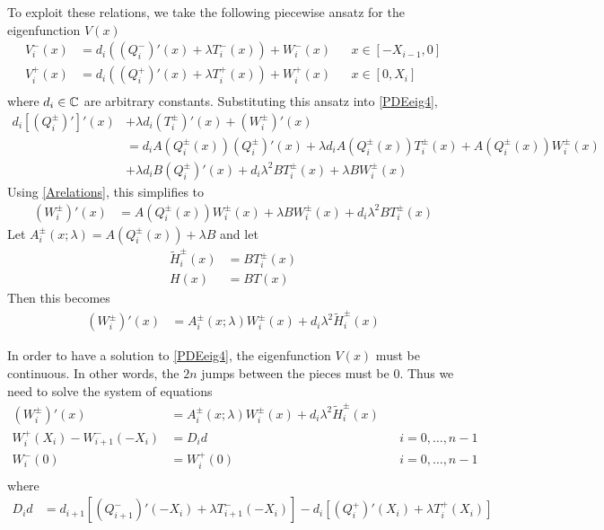 \documentclass[thesis.tex]{subfiles}
\begin{document}
To exploit these relations, we take the following piecewise ansatz for the eigenfunction $V(x)$
\begin{equation}\label{Vpiecewise}
\begin{aligned}
V_i^-(x) &= d_i ((Q_i^-)'(x) + \lambda T_i^-(x)) + W_i^-(x) && x \in [-X_{i-1}, 0] \\
V_i^+(x) &= d_i ((Q_i^+)'(x) + \lambda T_i^+(x)) + W_i^+(x) && x \in [0, X_i] \\
\end{aligned}
\end{equation}
where $d_i \in {\mathbb C}$ are arbitrary constants. Substituting this ansatz into \eqref{PDEeig4},
\begin{align*}
d_i [(Q_i^\pm)']'(x) &+ \lambda d_i (T_i^\pm)'(x) + (W_i^\pm)'(x) \\
&= d_i A(Q_i^\pm(x)) (Q_i^\pm)'(x) + \lambda d_i A(Q_i^\pm(x)) T_i^\pm(x) + A(Q_i^\pm(x)) W_i^\pm(x) \\
&+ \lambda d_i B (Q_i^\pm)'(x) + d_i \lambda^2 B T_i^\pm(x) + \lambda B W_i^\pm(x)
\end{align*}
Using \eqref{Arelations}, this simplifies to
\begin{align*}
(W_i^\pm)'(x) &= A(Q_i^\pm(x)) W_i^\pm(x) + \lambda B W_i^\pm(x) + d_i \lambda^2 B T_i^\pm(x) 
\end{align*}
Let $A_i^\pm(x; \lambda) = A(Q_i^\pm(x)) + \lambda B$ and let
\begin{align*}
\tilde{H}_i^\pm(x) &= B T_i^\pm(x) \\ 
H(x) &= B T(x)
\end{align*}
Then this becomes 
\begin{align*}
(W_i^\pm)'(x) &= A_i^\pm(x; \lambda) W_i^\pm(x) + d_i \lambda^2 \tilde{H}_i^\pm(x)
\end{align*}

In order to have a solution to \eqref{PDEeig4}, the eigenfunction $V(x)$ must be continuous. In other words, the $2n$ jumps between the pieces must be 0. Thus we need to solve the system of equations
\begin{align*}
(W_i^\pm)'(x) &= A_i^\pm(x; \lambda) W_i^\pm(x) + d_i \lambda^2 \tilde{H}_i^\pm(x) \\
W_i^+(X_i) - W_{i+1}^-(-X_i) &= D_i d && i = 0, \dots, n-1 \\
W_i^-(0) &= W_i^+(0) && i = 0, \dots, n-1  \\
\end{align*}
where
\begin{align}\label{defDid}
D_i d &= d_{i+1}[(Q_{i+1}^-)'(-X_i) + \lambda T_{i+1}^-(-X_i)]
- d_i [ (Q_i^+)'(X_i) + \lambda T_i^+(X_i) ] \\
\end{align}
\end{document}
